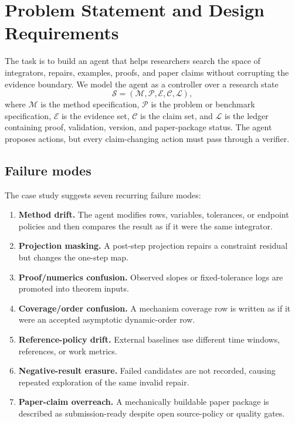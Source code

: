\documentclass[10pt]{article}
\begin{document}
\section{Problem Statement and Design Requirements}

The task is to build an agent that helps researchers search the space of
integrators, repairs, examples, proofs, and paper claims without corrupting the
evidence boundary. We model the agent as a controller over a research state
\[
  \mathcal{S} = (\mathcal{M},\mathcal{P},\mathcal{E},\mathcal{C},\mathcal{L}),
\]
where $\mathcal{M}$ is the method specification, $\mathcal{P}$ is the problem
or benchmark specification, $\mathcal{E}$ is the evidence set, $\mathcal{C}$ is
the claim set, and $\mathcal{L}$ is the ledger containing proof, validation,
version, and paper-package status. The agent proposes actions, but every
claim-changing action must pass through a verifier.

\subsection{Failure modes}

The case study suggests seven recurring failure modes:
\begin{enumerate}
  \item \textbf{Method drift.} The agent modifies rows, variables, tolerances,
  or endpoint policies and then compares the result as if it were the same
  integrator.
  \item \textbf{Projection masking.} A post-step projection repairs a
  constraint residual but changes the one-step map.
  \item \textbf{Proof/numerics confusion.} Observed slopes or fixed-tolerance
  logs are promoted into theorem inputs.
  \item \textbf{Coverage/order confusion.} A mechanism coverage row is written
  as if it were an accepted asymptotic dynamic-order row.
  \item \textbf{Reference-policy drift.} External baselines use different
  time windows, references, or work metrics.
  \item \textbf{Negative-result erasure.} Failed candidates are not recorded,
  causing repeated exploration of the same invalid repair.
  \item \textbf{Paper-claim overreach.} A mechanically buildable paper package
  is described as submission-ready despite open source-policy or quality gates.
\end{enumerate}
\end{document}
